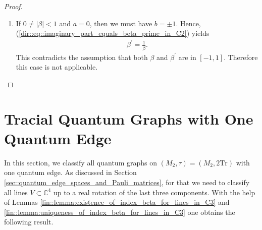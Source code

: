 \documentclass{amsart}
\newcommand{\C}{\mathbb{C}}
\begin{document}
\begin{proof}
\begin{enumerate}
\begin{align*}
        \end{align*}
        Thus, we obtain \ref{lin::item:beta_beta_prime_are_index_of_the_same_line_in_C2:b} with $\lambda = \frac{1}{a+ib\beta} = a$.
        \item If $0 \neq |\beta| < 1$ and $a =0$, then we must have $b= \pm 1$. Hence, (\ref{dir::eq::imaginary_part_equals_beta_prime_in_C2}) yields
        \begin{align*}
            \beta^\prime = \frac{1}{\beta}.
        \end{align*}
        This contradicts the assumption that both $\beta$ and $\beta^\prime$ are in $[-1,1]$. Therefore this case is not applicable.
    \end{enumerate}
\end{proof}


























\section{Tracial Quantum Graphs with One Quantum Edge}
\label{sec::t1e}

In this section, we classify all quantum graphs on $(M_2, \tau)=(M_2, 2 \mathrm{Tr})$ with one quantum edge. As discussed in Section \ref{sec::quantum_edge_spaces_and_Pauli_matrices}, for that we need to classify all lines $V \subset \C^4$ up to a real rotation of the last three components. With the help of Lemmas \ref{lin::lemma:existence_of_index_beta_for_lines_in_C3} and \ref{lin::lemma:uniqueness_of_index_beta_for_lines_in_C3} one obtains the following result.
\end{document}
